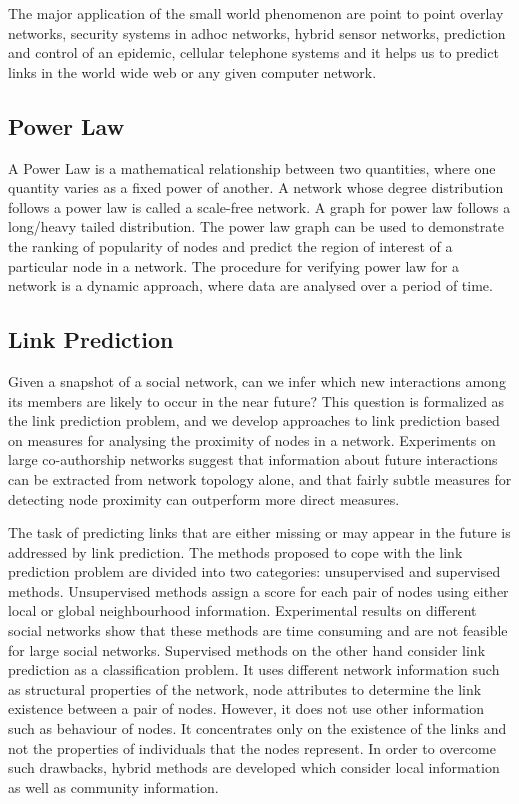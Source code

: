 The major application of the small world phenomenon are point to point overlay networks, security systems in adhoc networks, hybrid sensor networks, prediction and control of an epidemic, cellular telephone systems and it helps us to predict links in the world wide web or any given computer network.

\subsection{Power Law}

A Power Law is a mathematical relationship between two quantities, where one quantity varies as a fixed power of another. A network whose degree distribution follows a power law is called a scale-free network. A graph for power law follows a long/heavy tailed distribution. The power law graph can be used to demonstrate the ranking of popularity of nodes and predict the region of interest of a particular node in a network. The procedure for verifying power law for a network is a dynamic approach, where data are analysed over a period of time.

\subsection{Link Prediction}

Given a snapshot of a social network, can we infer which new interactions among its members are likely to occur in the near future? This question is formalized as the link prediction problem, and we develop approaches to link prediction based on measures for analysing the proximity of nodes in a network. Experiments on large co-authorship networks suggest that information about future interactions can be extracted from network topology alone, and that fairly subtle measures for detecting node proximity can outperform more direct measures.

The task of predicting links that are either missing or may appear in the future is addressed by link prediction. The methods proposed to cope with the link prediction problem are divided into two categories: unsupervised and supervised methods. Unsupervised methods assign a score for each pair of nodes using either local or global neighbourhood information. Experimental results on different social networks show that these methods are time consuming and are not feasible for large social networks. Supervised methods on the other hand consider link prediction as a classification problem. It uses different network information such as structural properties of the network, node attributes to determine the link existence between a pair of nodes. However, it does not use other information such as behaviour of nodes. It concentrates only on the existence of the links and not the properties of individuals that the nodes represent. In order to overcome such drawbacks, hybrid methods are developed which consider local information as well as community information.

